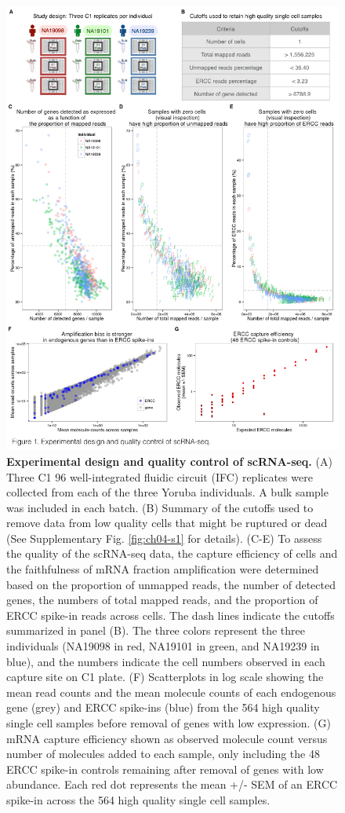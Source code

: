 \begin{figure}[htbp]
\centering
\includegraphics[trim=0 .5in 0 0,clip,width=5in]{img/ch04/Figure01.jpeg}
\caption[Experimental design and quality control of
scRNA-seq.]{\textbf{Experimental design and quality control of
scRNA-seq.} (A) Three C1 96 well-integrated fluidic circuit (IFC)
replicates were collected from each of the three Yoruba individuals. A
bulk sample was included in each batch. (B) Summary of the cutoffs used
to remove data from low quality cells that might be ruptured or dead
(See Supplementary Fig. \ref{fig:ch04-s1} for details). (C-E) To assess the quality of
the scRNA-seq data, the capture efficiency of cells and the faithfulness
of mRNA fraction amplification were determined based on the proportion
of unmapped reads, the number of detected genes, the numbers of total
mapped reads, and the proportion of ERCC spike-in reads across cells.
The dash lines indicate the cutoffs summarized in panel (B). The three
colors represent the three individuals (NA19098 in red, NA19101 in
green, and NA19239 in blue), and the numbers indicate the cell numbers
observed in each capture site on C1 plate. (F) Scatterplots in log scale
showing the mean read counts and the mean molecule counts of each
endogenous gene (grey) and ERCC spike-ins (blue) from the 564 high
quality single cell samples before removal of genes with low expression.
(G) mRNA capture efficiency shown as observed molecule count versus
number of molecules added to each sample, only including the 48 ERCC
spike-in controls remaining after removal of genes with low abundance.
Each red dot represents the mean +/- SEM of an ERCC spike-in across the
564 high quality single cell samples.}
\label{fig:ch04-study-design}
\end{figure}

